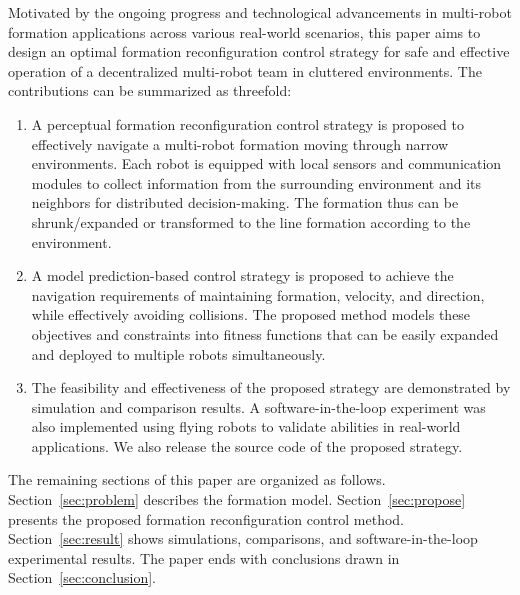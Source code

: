 Motivated by the ongoing progress and technological advancements in multi-robot formation applications across various real-world scenarios, this paper aims to design an optimal formation reconfiguration control strategy for safe and effective operation of a decentralized multi-robot team in cluttered environments. The contributions can be summarized as threefold:
\begin{enumerate}
    \item A perceptual formation reconfiguration control strategy is proposed to effectively navigate a multi-robot formation moving through narrow environments. Each robot is equipped with local sensors and communication modules to collect information from the surrounding environment and its neighbors for distributed decision-making. The formation thus can be shrunk/expanded or transformed to the line formation according to the environment.
        \item A model prediction-based control strategy is proposed to achieve the navigation requirements of maintaining formation, velocity, and direction, while effectively avoiding collisions. The proposed method models these objectives and constraints into fitness functions that can be easily expanded and deployed to multiple robots simultaneously.
    \item The feasibility and effectiveness of the proposed strategy are demonstrated by simulation and comparison results. A software-in-the-loop experiment was also implemented using flying robots to validate abilities in real-world applications. We also release the source code of the proposed strategy.
\end{enumerate}

The remaining sections of this paper are organized as follows. Section~\ref{sec:problem} describes the formation model. Section~\ref{sec:propose} presents the proposed formation reconfiguration control method. Section~\ref{sec:result} shows simulations, comparisons, and software-in-the-loop experimental results. The paper ends with conclusions drawn in Section~\ref{sec:conclusion}.
